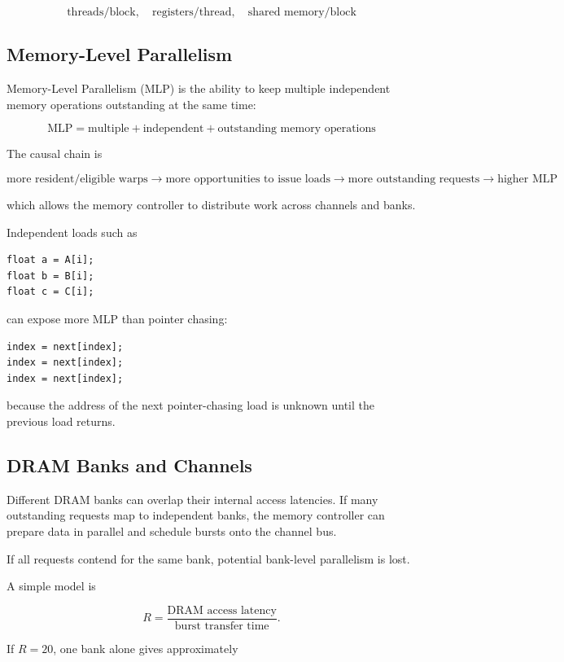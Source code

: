 \documentclass[11pt]{article}
\begin{document}
\[
\boxed{
\text{threads/block},\quad
\text{registers/thread},\quad
\text{shared memory/block}
}
\]

\subsection{Memory-Level Parallelism}

Memory-Level Parallelism (MLP) is the ability to keep multiple independent memory operations outstanding at the same time:

\[
\boxed{
\text{MLP}
=
\text{multiple}
+
\text{independent}
+
\text{outstanding memory operations}
}
\]

The causal chain is

\[
\boxed{
\text{more resident/eligible warps}
\rightarrow
\text{more opportunities to issue loads}
\rightarrow
\text{more outstanding requests}
\rightarrow
\text{higher MLP}
}
\]

which allows the memory controller to distribute work across channels and banks.

Independent loads such as

\begin{lstlisting}
float a = A[i];
float b = B[i];
float c = C[i];
\end{lstlisting}

can expose more MLP than pointer chasing:

\begin{lstlisting}
index = next[index];
index = next[index];
index = next[index];
\end{lstlisting}

because the address of the next pointer-chasing load is unknown until the previous load returns.

\subsection{DRAM Banks and Channels}

Different DRAM banks can overlap their internal access latencies. If many outstanding requests map to independent banks, the memory controller can prepare data in parallel and schedule bursts onto the channel bus.

If all requests contend for the same bank, potential bank-level parallelism is lost.

A simple model is

\[
R=
\frac{\text{DRAM access latency}}
{\text{burst transfer time}}.
\]

If \(R=20\), one bank alone gives approximately
\end{document}
